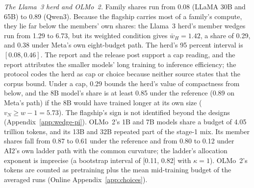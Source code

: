 \textit{The Llama~3 herd and OLMo~2.} Family shares run from 0.08 (LLaMA 30B and 65B) to 0.89 (Qwen3). Because the
flagship carries most of a family's compute, they lie far below the members' own shares: the Llama~3 herd's member wedges
run from 1.29 to 6.73, but its weighted condition gives $\bar w_H=1.42$, a share of 0.29, and 0.38 under Meta's own
eight-budget path. The herd's 95 percent interval is $[0.08,0.46]$. The report and the release post
\citep{grattafiori2024llama,meta2024llama3} support a cap reading, and the report attributes the smaller models' long
training to inference efficiency; the protocol codes the herd as cap or choice because neither source states that the
corpus bound. Under a cap, 0.29 bounds the herd's value of compactness from below, and the 8B model's share is at least
0.85 under the reference (0.89 on Meta's path) if the 8B would have trained longer at its own size ($v_N\ge w-1=5.73$).
The flagship's sign is not identified beyond the designs (Appendix~\ref{app:wedge-pi}). OLMo~2's 1B and 7B models share a
budget of 4.05 trillion tokens, and its 13B and 32B repeated part of the stage-1 mix. Its member shares fall from 0.87 to
0.61 under the reference and from 0.80 to 0.12 under AI2's own ladder path with the common curvature; the ladder's
allocation exponent is imprecise (a bootstrap interval of [0.11, 0.82] with $\kappa=1$). OLMo~2's tokens are counted as
pretraining plus the mean mid-training budget of the averaged runs (Online Appendix~\ref{app:choices}).

